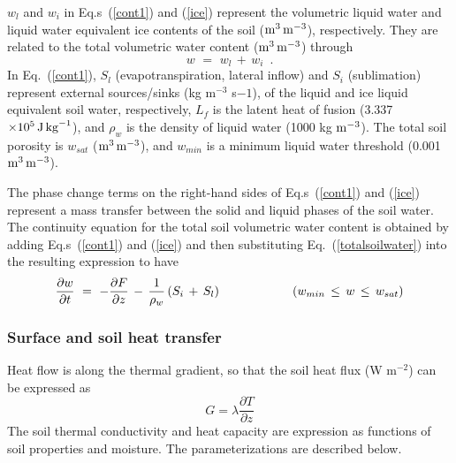 $w_l$ and $w_i$ in Eq.s~(\ref{cont1}) and (\ref{ice}) 
represent
the volumetric liquid water and liquid water equivalent ice contents
of the soil (${\rm m^3 \, m^{-3}}$), respectively. They are
related to the total volumetric water content 
(${\rm m^3 \,m^{-3}}$) through
%
\begin{equation} \label{totalsoilwater}
w \,\,=\,\,w_l \, +\, w_i
\,\,\, .
\end{equation}
%
In Eq.~(\ref{cont1}), 
$S_l$ (evapotranspiration, lateral inflow) 
and $S_i$ (sublimation) represent external sources/sinks
(kg m$^{-3}$ s${-1}$), 
of the liquid and ice liquid equivalent soil water, respectively, 
$L_f$ is the latent heat of fusion 
(3.337 ${\rm \times {10}^5 \,J\,{kg}^{-1}}$),
and $\rho_w$ is the density
of liquid water (1000 kg ${\rm m^{-3}}$).
The total soil porosity is 
$w_{sat}$ (${\rm m^3 \, m^{-3}}$), and
$w_{min}$ is a minimum liquid water threshold
(0.001 ${\rm m^3 \, m^{-3}}$).

The phase change terms on the right-hand sides of Eq.s~(\ref{cont1}) 
and (\ref{ice}) represent a mass
transfer between the solid and liquid phases
of the soil water. 
The continuity equation for the total
soil volumetric water content is obtained by
adding Eq.s~(\ref{cont1}) and (\ref{ice}) and then
substituting Eq.~(\ref{totalsoilwater}) 
into the resulting expression to have
%
\begin{equation}
\frac{\partial w}{\partial t} \,\,=\,\,
-\frac{\partial F}{\partial z} \,-\, \frac{1}{\rho_w}\left(S_i\,+\, S_l\right)
\hskip.8in 
\left(w_{min}\,\leq\, w\,\leq\,w_{sat}\right)
\end{equation}
%

\subsubsection{Surface and soil heat transfer}
%
Heat flow is along the thermal gradient,
so that the soil heat flux (W m$^{-2}$) can be expressed as
%
\begin{equation}
\label{gxxx}
G = \lambda \frac{\partial T}{\partial z}
\end{equation}
%
The soil thermal conductivity and heat capacity 
are expression as functions of soil properties
and moisture. The parameterizations are described below.


